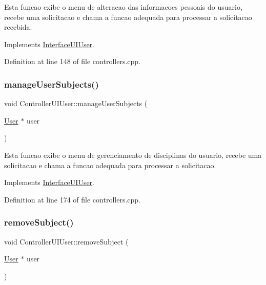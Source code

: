 Esta funcao exibe o menu de alteracao das informacoes pessoais do usuario, recebe uma solicitacao e chama a funcao adequada para processar a solicitacao recebida. 

Implements \hyperlink{class_interface_u_i_user_a167f4ea2954c5b4e81d175bca1cee1f9}{Interface\+U\+I\+User}.



Definition at line 148 of file controllers.\+cpp.

\mbox{\label{class_controller_u_i_user_a6a3a889cc4726487baa3e2f19f646810}} 
\subsubsection{\texorpdfstring{manage\+User\+Subjects()}{manageUserSubjects()}}
{\footnotesize\ttfamily void Controller\+U\+I\+User\+::manage\+User\+Subjects (\begin{DoxyParamCaption}\item[{\hyperlink{class_user}{User} $\ast$}]{user }\end{DoxyParamCaption})\hspace{0.3cm}{\ttfamily [virtual]}}

Esta funcao exibe o menu de gerenciamento de disciplinas do usuario, recebe uma solicitacao e chama a funcao adequada para processar a solicitacao. 

Implements \hyperlink{class_interface_u_i_user_a3830114ce74533d9ba66b0baaac79f0b}{Interface\+U\+I\+User}.



Definition at line 174 of file controllers.\+cpp.

\mbox{\label{class_controller_u_i_user_a6ec069819ab7fe85b8419ee00714b8a3}} 
\subsubsection{\texorpdfstring{remove\+Subject()}{removeSubject()}}
{\footnotesize\ttfamily void Controller\+U\+I\+User\+::remove\+Subject (\begin{DoxyParamCaption}\item[{\hyperlink{class_user}{User} $\ast$}]{user }\end{DoxyParamCaption})\hspace{0.3cm}{\ttfamily [virtual]}}

